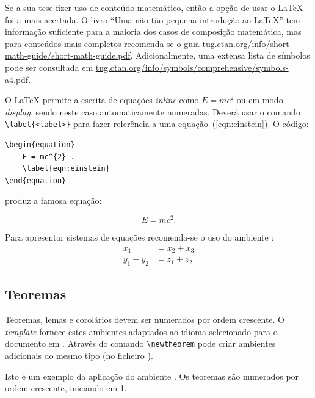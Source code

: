 Se a sua tese fizer uso de conteúdo matemático, então a opção de usar o \LaTeX{} foi a mais acertada. O livro ``Uma não tão pequena introdução ao \LaTeX{}'' tem informação suficiente para a maioria dos casos de composição matemática, mas para conteúdos mais completos recomenda-se o guia \url{tug.ctan.org/info/short-math-guide/short-math-guide.pdf}. Adicionalmente, uma extensa lista de símbolos pode ser consultada em \url{tug.ctan.org/info/symbols/comprehensive/symbols-a4.pdf}.

O \LaTeX{} permite a escrita de equações \textit{inline} como $E = mc^{2}$ ou em modo \textit{display}, sendo neste caso automaticamente numeradas. Deverá usar o comando \verb|\label{<label>}| para fazer referência a uma equação~(\ref{eqn:einstein}). O código:
\newpage
\begin{verbatim}
\begin{equation}
	E = mc^{2} .
	\label{eqn:einstein}
\end{equation}
\end{verbatim}

\noindent produz a famosa equação:

\begin{equation}
E = mc^{2} .
\label{eqn:einstein}
\end{equation}

Para apresentar sistemas de equações recomenda-se o uso do ambiente :
\begin{align}
	x_1 &= x_2 + x_3\\
	y_1 + y_2 &= z_1 + z_2
	\label{eqn:eq2}
\end{align}  


\subsection{Teoremas}

Teoremas, lemas e corolários devem ser numerados por ordem crescente. O \textit{template} fornece estes ambientes adaptados ao idioma selecionado para o documento em . Através do comando \verb|\newtheorem| pode criar ambientes adicionais do mesmo tipo (no ficheiro ). 

\begin{theorem}
Isto é um exemplo da aplicação do ambiente . Os teoremas são numerados por ordem crescente, iniciando em 1.
\end{theorem}

